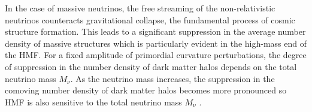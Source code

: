 In the case of massive neutrinos, the free streaming of the non-relativistic neutrinos counteracts gravitational collapse, the fundamental process of cosmic structure formation. This leads to a significant suppression in the average number density of massive structures which is particularly evident in the high-mass end of the HMF. For a fixed amplitude of primordial curvature perturbations, the degree of suppression in the number density of dark matter halos depends on the total neutrino mass $M_{\nu}$. As the neutrino mass increases, the suppression in the comoving number density of dark matter halos becomes more pronounced so HMF is also sensitive to the total neutrino mass $M_{\nu}$ \cite{Marulli_2011,Brandbyge_2010}.

